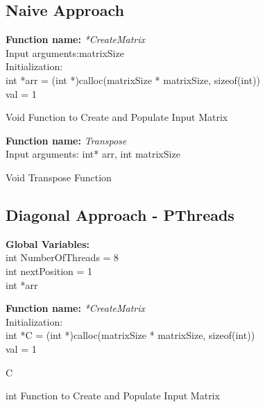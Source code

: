 \documentclass[10pt,journal]{article}
\begin{document}
\subsection{Naive Approach}
\begin{algorithm}[H]
\SetAlgoLined
\textbf{Function name:} \emph{*CreateMatrix}\\\vspace{10pt}
Input arguments:\:matrixSize\\

Initialization\::\\ 
 int *arr = (int *)calloc(matrixSize * matrixSize, sizeof(int))\\
 val = 1
 
\vspace{10pt} 

\caption{Void Function to Create and Populate Input Matrix}
\end{algorithm}

\begin{algorithm}[H]
\SetAlgoLined
\textbf{Function name:} \emph{Transpose}\\\vspace{10pt}
Input arguments:\: int* arr, int matrixSize \\

\vspace{10pt} 

\caption{Void Transpose Function}
\end{algorithm}

\newpage
\subsection{Diagonal Approach - PThreads}
\textbf{Global Variables:} \\
int NumberOfThreads = 8\\
int nextPosition = 1\\
int *arr\\
\vspace{10pt}
\begin{algorithm}[H]
\SetAlgoLined
\textbf{Function name:} \emph{*CreateMatrix}\\\vspace{10pt}
Initialization\::\\
int *C = (int *)calloc(matrixSize * matrixSize, sizeof(int))\\
val = 1

\vspace{10pt} 
\Return C
\caption{int Function to Create and Populate Input Matrix}
\end{algorithm}
\end{document}
